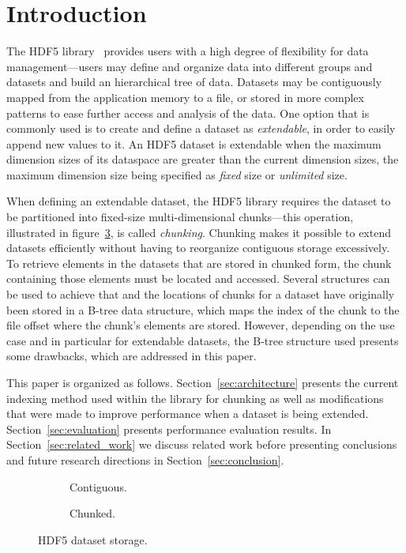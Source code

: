 
\section{Introduction}

The HDF5 library~\cite{Folk2011}\cite{Folk1999} provides users with a high degree of flexibility for data
management---users may define and organize data into different groups and
datasets and build an hierarchical tree of data. Datasets may be contiguously 
mapped from the application memory to a file, or stored in more complex 
patterns to ease further access and analysis of the data. One option that
is commonly used is to create and define a dataset as \textit{extendable},
in order to easily append new values to it.
An HDF5 dataset is extendable when the maximum dimension sizes of its 
dataspace are greater than the current dimension sizes, the maximum dimension 
size being specified as \textit{fixed} size or \textit{unlimited} size.

When defining an extendable dataset, the HDF5 library requires the dataset
to be partitioned into fixed-size multi-dimensional chunks---this operation, 
illustrated in figure~\ref{fig:hdf5_dataset}, is called \textit{chunking}.
Chunking makes it possible to extend datasets efficiently without having to
reorganize contiguous storage excessively. To retrieve elements in the
datasets that are stored in chunked form, the chunk containing those
elements must be located and accessed. Several structures can be used
to achieve that and the locations of chunks for a dataset have originally 
been stored in a B-tree data structure, which maps the index of the chunk to 
the file offset where the chunk's elements are stored. However, depending
on the use case and in particular for extendable datasets, the B-tree
structure used presents some drawbacks, which are addressed in this paper.

This paper is organized as follows. 
Section~\ref{sec:architecture} presents the 
current indexing method used within the library for chunking as well as 
modifications that were made to improve performance when a dataset is 
being extended. Section~\ref{sec:evaluation} presents performance evaluation 
results. In Section~\ref{sec:related_work} we discuss related work before
presenting conclusions and future research directions in Section~\ref{sec:conclusion}.

\begin{figure}
\begin{subfigure}[b]{.49\linewidth}
\centering

\caption{Contiguous.}
\label{fig:contiguous}
\end{subfigure}%
\hfill
\begin{subfigure}[b]{.49\linewidth}
\centering

\vspace{-15pt}
\caption{Chunked.}
\label{fig:chunked}
\end{subfigure}
\caption{HDF5 dataset storage.}
\label{fig:hdf5_dataset}
\end{figure}

